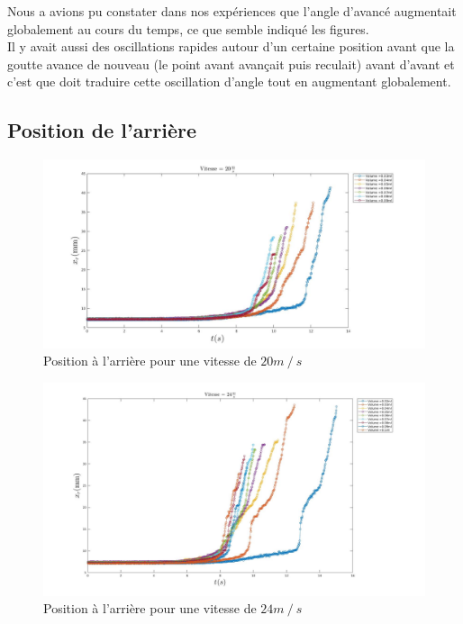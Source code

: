 \documentclass[french]{article}
\begin{document}
Nous a avions pu constater dans nos expériences que l'angle d'avancé augmentait globalement au cours du temps, ce que semble indiqué les figures.\\

Il y avait aussi des oscillations rapides autour d'un certaine position avant que la goutte avance de nouveau (le point avant avançait puis reculait) avant d'avant et c'est que doit traduire cette oscillation d'angle tout en augmentant globalement.

\newpage
\subsection{Position de l'arrière}
\begin{figure}[h]
	\centering
	\includegraphics[width = \linewidth]{./image/v=20xr.jpg}
	\caption{Position à l'arrière pour une vitesse de $20m\mathbin{/}s$}
\end{figure}
\begin{figure}[h]
	\centering
	\includegraphics[width = \linewidth]{./image/v=24xr.jpg}
	\caption{Position à l'arrière pour une vitesse de $24m\mathbin{/}s$}
\end{figure}
\newpage
\end{document}
